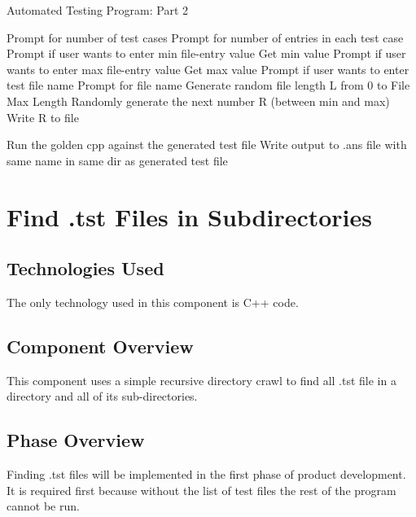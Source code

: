 \pagebreak
\begin{algorithm} [H]
\caption{Automated Testing Program: Part 2}
\label{alg2}
\begin{algorithmic}
  
        \STATE Prompt for number of test cases
        \STATE Prompt for number of entries in each test case
        \STATE Prompt if user wants to enter min file-entry value
            \STATE Get min value
		\ENDIF        
        \STATE Prompt if user wants to enter max file-entry value
            \STATE Get max value
        \ENDIF
        \STATE Prompt if user wants to enter test file name
            \STATE Prompt for file name
		\ENDIF
            \STATE Generate random file length L from 0 to File Max Length
                \STATE Randomly generate the next number R (between min and max)
                \STATE Write R to file
            \ENDWHILE
            
            \STATE Run the golden cpp against the generated test file
            \STATE Write output to .ans file with same name in same dir as generated test file
        \ENDWHILE
    \ENDIF   

\end{algorithmic}
\end{algorithm}
\pagebreak
\section{Find .tst Files in Subdirectories }

\subsection{Technologies  Used}
The only technology used in this component is C++ code.

\subsection{Component  Overview}
This component uses a simple recursive directory crawl to find all .tst file in a directory and all of its sub-directories.

\subsection{Phase Overview}
Finding .tst files will be implemented in the first phase of product development. It is required first because without the list of test files the rest of the program cannot be run.

